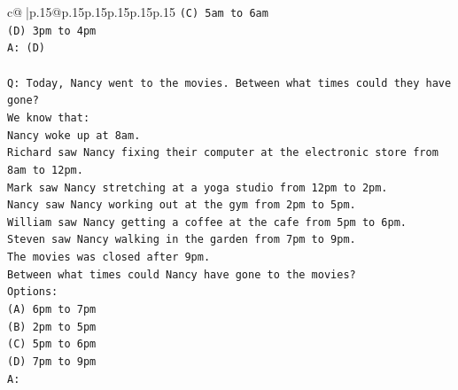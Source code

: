 \documentclass{article}
\begin{document}
{\begin{supertabular}{c@{$\;$}|p{.15\linewidth}@{}p{.15\linewidth}p{.15\linewidth}p{.15\linewidth}p{.15\linewidth}p{.15\linewidth}}
{{{\texttt{(C) 5am to 6am} \\
\texttt{(D) 3pm to 4pm} \\
\texttt{A: (D)} \\
\\ 
\texttt{Q: Today, Nancy went to the movies. Between what times could they have gone?} \\
\texttt{We know that:} \\
\texttt{Nancy woke up at 8am.} \\
\texttt{Richard saw Nancy fixing their computer at the electronic store from 8am to 12pm.} \\
\texttt{Mark saw Nancy stretching at a yoga studio from 12pm to 2pm.} \\
\texttt{Nancy saw Nancy working out at the gym from 2pm to 5pm.} \\
\texttt{William saw Nancy getting a coffee at the cafe from 5pm to 6pm.} \\
\texttt{Steven saw Nancy walking in the garden from 7pm to 9pm.} \\
\texttt{The movies was closed after 9pm.} \\
\texttt{Between what times could Nancy have gone to the movies?} \\
\texttt{Options:} \\
\texttt{(A) 6pm to 7pm} \\
\texttt{(B) 2pm to 5pm} \\
\texttt{(C) 5pm to 6pm} \\
\texttt{(D) 7pm to 9pm} \\
\texttt{A:} \\
            }
        }
    }
     \\ \\


\end{supertabular}}
\end{document}

